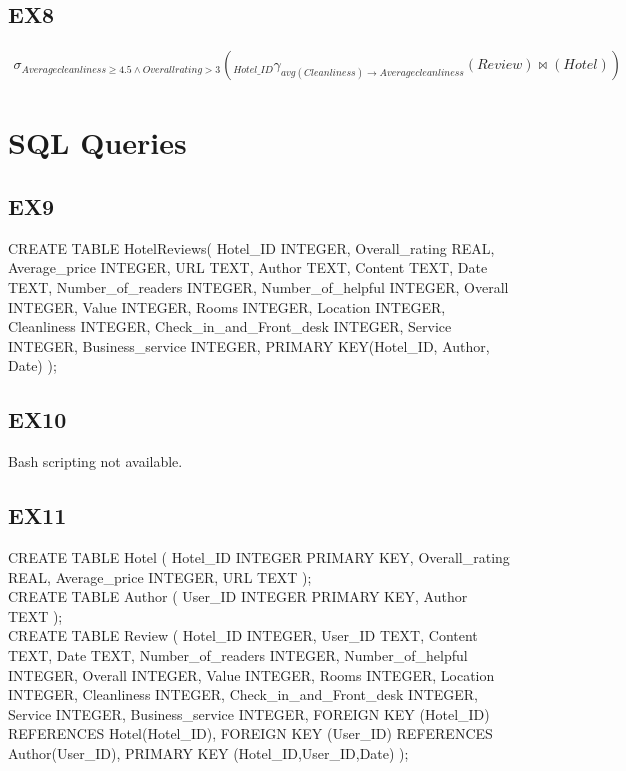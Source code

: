 \documentclass{article}
\begin{document}
	\subsection{EX8}
	\begin{eqnarray}
	\sigma _{Average cleanliness \geq 4.5 \wedge Overall rating > 3}(_{Hotel\_ID} \gamma _{avg(Cleanliness) \rightarrow Average cleanliness}(Review) \bowtie (Hotel))
	\end{eqnarray}
	
	\section{SQL Queries}
	
	\subsection{EX9}
	CREATE TABLE HotelReviews(
	Hotel\_ID INTEGER,
	Overall\_rating REAL,
	Average\_price INTEGER,
	URL TEXT,
	Author TEXT,
	Content TEXT,
	Date TEXT,
	Number\_of\_readers INTEGER,
	Number\_of\_helpful INTEGER,
	Overall INTEGER,
	Value INTEGER,
	Rooms INTEGER,
	Location INTEGER,
	Cleanliness INTEGER,
	Check\_in\_and\_Front\_desk INTEGER,
	Service INTEGER,
	Business\_service INTEGER,
	PRIMARY KEY(Hotel\_ID, Author, Date)
	);
	
	\subsection{EX10}
	Bash scripting not available.
	
	\subsection{EX11}
	CREATE TABLE Hotel (
	Hotel\_ID INTEGER PRIMARY KEY,
	Overall\_rating REAL,
	Average\_price INTEGER,
	URL TEXT
	); 
	\\
	CREATE TABLE Author (
	User\_ID INTEGER PRIMARY KEY,
	Author TEXT
	);	
	\\
	CREATE TABLE Review (
	Hotel\_ID INTEGER,
	User\_ID TEXT,
	Content TEXT,
	Date TEXT,
	Number\_of\_readers INTEGER,
	Number\_of\_helpful INTEGER,
	Overall INTEGER,
	Value INTEGER,
	Rooms INTEGER,
	Location INTEGER,
	Cleanliness INTEGER,
	Check\_in\_and\_Front\_desk INTEGER,
	Service INTEGER,
	Business\_service INTEGER,
	FOREIGN KEY (Hotel\_ID) REFERENCES Hotel(Hotel\_ID),
	FOREIGN KEY (User\_ID) REFERENCES Author(User\_ID),
	PRIMARY KEY (Hotel\_ID,User\_ID,Date)
	);
	
	
\end{document}
